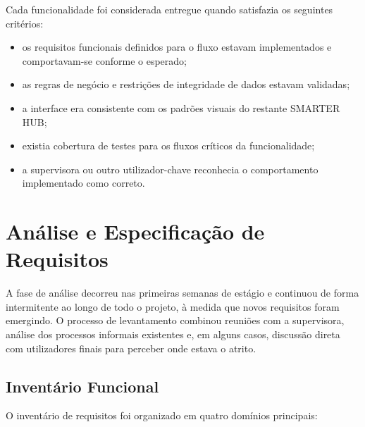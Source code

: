 \documentclass[12pt, a4paper, twoside, openright]{report}
\begin{document}
Cada funcionalidade foi considerada entregue quando satisfazia os seguintes critérios:

\begin{itemize}
  \item os requisitos funcionais definidos para o fluxo estavam implementados
        e comportavam-se conforme o esperado;
  \item as regras de negócio e restrições de integridade de dados estavam validadas;
  \item a interface era consistente com os padrões visuais do restante SMARTER HUB;
  \item existia cobertura de testes para os fluxos críticos da funcionalidade;
  \item a supervisora ou outro utilizador-chave reconhecia o comportamento implementado
        como correto.
\end{itemize}

\section{Análise e Especificação de Requisitos}

A fase de análise decorreu nas primeiras semanas de estágio e continuou de forma
intermitente ao longo de todo o projeto, à medida que novos requisitos foram emergindo.
O processo de levantamento combinou reuniões com a supervisora, análise dos processos
informais existentes e, em alguns casos, discussão direta com utilizadores finais para
perceber onde estava o atrito.

\subsection{Inventário Funcional}

O inventário de requisitos foi organizado em quatro domínios principais:
\end{document}
